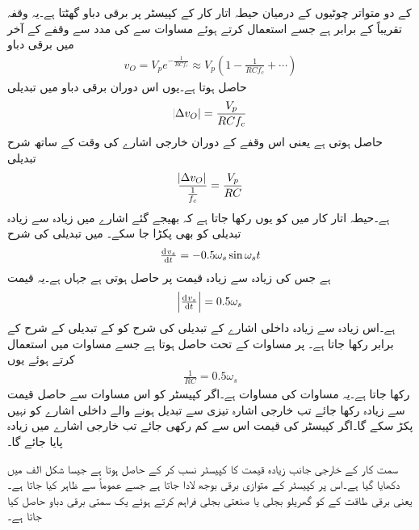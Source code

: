  کے دو متواتر چوٹیوں کے درمیان حیطہ اتار کار کے  کپیسٹر پر برقی دباو گھٹتا ہے۔یہ وقفہ تقریباً  کے برابر ہے جسے استعمال کرتے ہوئے  مساوات  سے  کی مدد سے وقفے کے آخر میں برقی دباو
\begin{align}
v_O=V_{p} e^{-\frac{1}{RC f_c}} \approx V_p \left(1-\frac{1}{RC f_c} +\cdots \right )
\end{align}
حاصل ہوتا ہے۔یوں اس دوران برقی دباو میں تبدیلی
\begin{align*}
\abs{\Delta v_O} =\frac{V_p}{RC f_c}
\end{align*}
حاصل ہوتی ہے یعنی اس وقفے کے دوران خارجی اشارے کی وقت کے ساتھ شرح تبدیلی 
\begin{align}\label{مساوات_ڈایوڈ_حیطہ_اتار_کار_خارجی_اشارہ}
\frac{\abs{\Delta v_O}}{\frac{1}{f_c}} =\frac{V_p}{RC}
\end{align}
ہے۔حیطہ اتار کار میں  کو یوں رکھا جاتا ہے کہ  بھیجے گئے اشارے  میں زیادہ سے زیادہ تبدیلی کو بھی پکڑا جا سکے۔ میں تبدیلی کی شرح
\begin{align*}
\od{v_s}{t}=-0.5 \omega_s \sin \omega_s t
\end{align*}
ہے جس کی زیادہ سے زیادہ قیمت  پر حاصل ہوتی ہے جہاں  ہے۔یہ قیمت 
\begin{align*}
\abs{\od{v_s}{t}}=0.5 \omega_s 
\end{align*} 
ہے۔اس زیادہ سے زیادہ داخلی اشارے کے تبدیلی کی شرح کو  کے تبدیلی کے شرح کے برابر رکھا جاتا ہے۔ پر مساوات  کے تحت  حاصل ہوتا ہے جسے مساوات  میں استعمال کرتے ہوئے یوں
\begin{align}
\frac{1}{RC}=0.5 \omega_s
\end{align}
رکھا جاتا ہے۔یہ مساوات  کی مساوات ہے۔اگر کپیسٹر کو اس مساوات سے حاصل قیمت سے زیادہ رکھا جائے تب خارجی اشارہ تیزی سے تبدیل ہونے والے داخلی اشارے کو نہیں پکڑ سکے گا۔اگر کپیسٹر کی قیمت اس سے کم رکھی جائے تب خارجی اشارے میں  زیادہ پایا جائے گا۔ 

سمت کار کے خارجی جانب زیادہ قیمت کا کپیسٹر نسب کر کے   حاصل ہوتا ہے جیسا شکل  الف میں دکھایا گیا ہے۔اس پر کپیسٹر کے متوازی برقی بوجھ لادا جاتا ہے جسے عموماً  سے ظاہر کیا جاتا ہے۔ یعنی برقی طاقت کے  کو  گھریلو بجلی یا صنعتی بجلی فراہم کرتے ہوئے یک سمتی برقی دباو  حاصل کیا جاتا ہے۔
 
